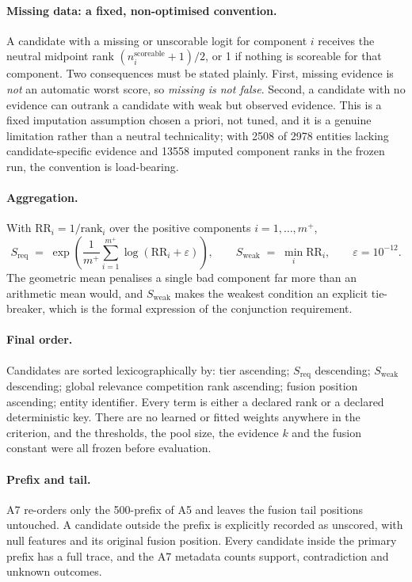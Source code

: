 \documentclass[11pt,a4paper]{article}
\begin{document}
\paragraph{Missing data: a fixed, non-optimised convention.} A candidate with a missing or unscorable logit for component $i$ receives the neutral midpoint rank $(n_i^{\mathrm{scoreable}}+1)/2$, or 1 if nothing is scoreable for that component. Two consequences must be stated plainly. First, missing evidence is \emph{not} an automatic worst score, so \emph{missing is not false}. Second, a candidate with no evidence can outrank a candidate with weak but observed evidence. This is a fixed imputation assumption chosen a priori, not tuned, and it is a genuine limitation rather than a neutral technicality; with 2508 of 2978 entities lacking candidate-specific evidence and 13558 imputed component ranks in the frozen run, the convention is load-bearing.

\paragraph{Aggregation.} With $\mathrm{RR}_i = 1/\mathrm{rank}_i$ over the positive components $i=1,\dots,m^{+}$,
\begin{equation}
S_{\mathrm{req}} \;=\; \exp\!\left( \frac{1}{m^{+}} \sum_{i=1}^{m^{+}} \log\!\left( \mathrm{RR}_i + \varepsilon \right) \right), \qquad
S_{\mathrm{weak}} \;=\; \min_i \mathrm{RR}_i , \qquad \varepsilon = 10^{-12} .
\end{equation}
The geometric mean penalises a single bad component far more than an arithmetic mean would, and $S_{\mathrm{weak}}$ makes the weakest condition an explicit tie-breaker, which is the formal expression of the conjunction requirement.

\paragraph{Final order.} Candidates are sorted lexicographically by: tier ascending; $S_{\mathrm{req}}$ descending; $S_{\mathrm{weak}}$ descending; global relevance competition rank ascending; fusion position ascending; entity identifier. Every term is either a declared rank or a declared deterministic key. There are no learned or fitted weights anywhere in the criterion, and the thresholds, the pool size, the evidence $k$ and the fusion constant were all frozen before evaluation.

\paragraph{Prefix and tail.} A7 re-orders only the 500-prefix of A5 and leaves the fusion tail positions untouched. A candidate outside the prefix is explicitly recorded as unscored, with null features and its original fusion position. Every candidate inside the primary prefix has a full trace, and the A7 metadata counts support, contradiction and unknown outcomes.
\end{document}
